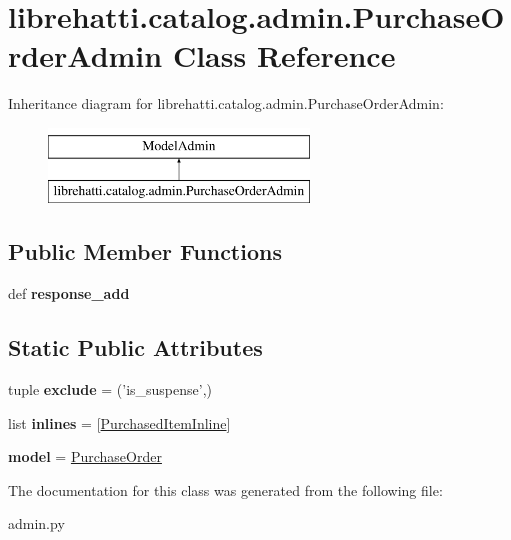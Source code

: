 \hypertarget{classlibrehatti_1_1catalog_1_1admin_1_1PurchaseOrderAdmin}{\section{librehatti.\-catalog.\-admin.\-Purchase\-Order\-Admin Class Reference}
\label{classlibrehatti_1_1catalog_1_1admin_1_1PurchaseOrderAdmin}
}
Inheritance diagram for librehatti.\-catalog.\-admin.\-Purchase\-Order\-Admin\-:\begin{figure}[H]
\begin{center}
\leavevmode
\includegraphics[height=2.000000cm]{classlibrehatti_1_1catalog_1_1admin_1_1PurchaseOrderAdmin}
\end{center}
\end{figure}
\subsection*{Public Member Functions}
\begin{DoxyCompactItemize}
\item 
\hypertarget{classlibrehatti_1_1catalog_1_1admin_1_1PurchaseOrderAdmin_a8033956ae850614346e5513658c243b3}{def {\bfseries response\-\_\-add}}\label{classlibrehatti_1_1catalog_1_1admin_1_1PurchaseOrderAdmin_a8033956ae850614346e5513658c243b3}

\end{DoxyCompactItemize}
\subsection*{Static Public Attributes}
\begin{DoxyCompactItemize}
\item 
\hypertarget{classlibrehatti_1_1catalog_1_1admin_1_1PurchaseOrderAdmin_a9926cfc46cacd53a08960127eec229e7}{tuple {\bfseries exclude} = ('is\-\_\-suspense',)}\label{classlibrehatti_1_1catalog_1_1admin_1_1PurchaseOrderAdmin_a9926cfc46cacd53a08960127eec229e7}

\item 
\hypertarget{classlibrehatti_1_1catalog_1_1admin_1_1PurchaseOrderAdmin_a0c31c8d7ad03fb4308293b169f849b98}{list {\bfseries inlines} = \mbox{[}\hyperlink{classlibrehatti_1_1catalog_1_1admin_1_1PurchasedItemInline}{Purchased\-Item\-Inline}\mbox{]}}\label{classlibrehatti_1_1catalog_1_1admin_1_1PurchaseOrderAdmin_a0c31c8d7ad03fb4308293b169f849b98}

\item 
\hypertarget{classlibrehatti_1_1catalog_1_1admin_1_1PurchaseOrderAdmin_aaac78c87d4a7687aa030d32ab8809443}{{\bfseries model} = \hyperlink{classlibrehatti_1_1catalog_1_1models_1_1PurchaseOrder}{Purchase\-Order}}\label{classlibrehatti_1_1catalog_1_1admin_1_1PurchaseOrderAdmin_aaac78c87d4a7687aa030d32ab8809443}

\end{DoxyCompactItemize}


The documentation for this class was generated from the following file\-:\begin{DoxyCompactItemize}
\item 
admin.\-py\end{DoxyCompactItemize}
